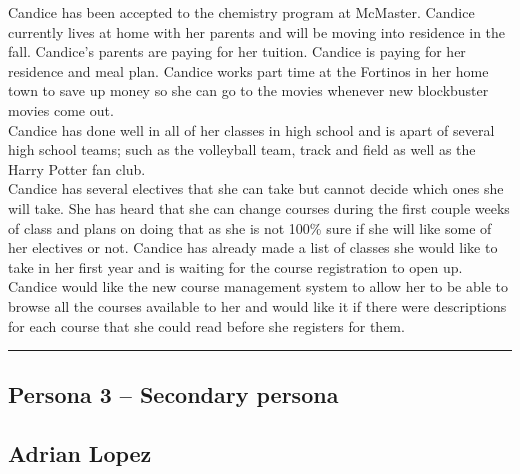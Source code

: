 \documentclass[12pt]{article}
\begin{document}
Candice has been accepted to the chemistry program at McMaster. Candice currently lives at home with her parents and will be moving into residence in the fall. Candice's parents are paying for her tuition. Candice is paying for her residence and meal plan. Candice works part time at the Fortinos in her home town to save up money so she can go to the movies whenever new blockbuster movies come out.\\

Candice has done well in all of her classes in high school and is apart of several high school teams; such as the volleyball team, track and field as well as the Harry Potter fan club.\\

Candice has several electives that she can take but cannot decide which ones she will take. She has heard that she can change courses during the first couple weeks of class and plans on doing that as she is not 100\% sure if she will like some of her electives or not. Candice has already made a list of classes she would like to take in her first year and is waiting for the course registration to open up. Candice would like the new course management system to allow her to be able to browse all the courses available to her and would like it if there were descriptions for each course that she could read before she registers for them.

\newpage
\hrule
\vspace{2mm}
\subsection{Persona 3 -- Secondary persona}
\vspace{11mm}

\subsection*{Adrian Lopez}
\vspace{4mm}
\end{document}
